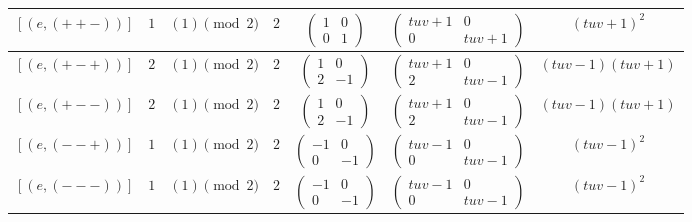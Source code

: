 \documentclass[11pt,english]{amsart}
\numberwithin{equation}{section}
\numberwithin{figure}{section}
\theoremstyle{plain}
\theoremstyle{plain}
\theoremstyle{definition}
\theoremstyle{remark}
\begin{document}
\begin{itemize}
\begin{table}[H]
\begin{tabular}{|c|c|c|c|c|c|c|}
        $[ (e, (++-)) ]$ & $1$ & $(1)\pmod 2$ & $2$ & 
        $\begin{pmatrix} 1 & 0 \\ 0 & 1 \end{pmatrix}$ & 
        $\begin{pmatrix} tuv+1 & 0 \\ 0 & tuv+1 \end{pmatrix}$ & 
        $(tuv+1)^2$ \\\hline
        
        $[ (e, (+-+)) ]$ & $2$ & $(1)\pmod 2$ & $2$ & 
        $\begin{pmatrix} 1 & 0 \\ 2 & -1 \end{pmatrix}$ & 
        $\begin{pmatrix} tuv+1 & 0 \\ 2 & tuv-1 \end{pmatrix}$ & 
        $(tuv-1)(tuv+1)$ \\\hline
        
        $[ (e, (+--)) ]$ & $2$ & $(1)\pmod 2$ & $2$ & 
        $\begin{pmatrix} 1 & 0 \\ 2 & -1 \end{pmatrix}$ & 
        $\begin{pmatrix} tuv+1 & 0 \\ 2 & tuv-1 \end{pmatrix}$ & 
        $(tuv-1)(tuv+1)$ \\\hline
        
        $[ (e, (--+)) ]$ & $1$ & $(1)\pmod 2$ & $2$ & 
        $\begin{pmatrix} -1 & 0 \\ 0 & -1 \end{pmatrix}$ & 
        $\begin{pmatrix} tuv-1 & 0 \\ 0 & tuv-1 \end{pmatrix}$ & 
        $(tuv-1)^2$ \\\hline
        
        $[ (e, (---)) ]$ & $1$ & $(1)\pmod 2$ & $2$ & 
        $\begin{pmatrix} -1 & 0 \\ 0 & -1 \end{pmatrix}$ & 
        $\begin{pmatrix} tuv-1 & 0 \\ 0 & tuv-1 \end{pmatrix}$ & 
        $(tuv-1)^2$ \\\hline
        

\end{tabular}
\end{table}
\end{itemize}
\end{document}
